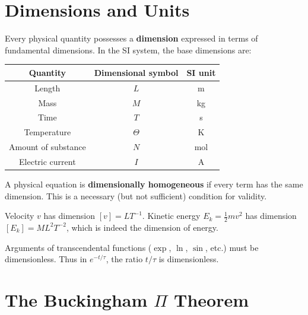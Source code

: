 \section{Dimensions and Units}

\begin{definition}
Every physical quantity possesses a \textbf{dimension} expressed in
terms of fundamental dimensions.  In the SI system, the base
dimensions are:
\begin{center}
\begin{tabular}{ccc}
\toprule
Quantity & Dimensional symbol & SI unit \\
\midrule
Length & $L$ & m \\
Mass & $M$ & kg \\
Time & $T$ & s \\
Temperature & $\Theta$ & K \\
Amount of substance & $N$ & mol \\
Electric current & $I$ & A \\
\bottomrule
\end{tabular}
\end{center}
\end{definition}

\begin{definition}
A physical equation is \textbf{dimensionally homogeneous} if every
term has the same dimension.  This is a necessary (but not sufficient)
condition for validity.
\end{definition}

\begin{example}
Velocity $v$ has dimension $[v]=LT^{-1}$.  Kinetic energy
$E_k = \tfrac{1}{2}mv^2$ has dimension $[E_k]=ML^2T^{-2}$, which is
indeed the dimension of energy.
\end{example}

\begin{remark}
Arguments of transcendental functions ($\exp$, $\ln$, $\sin$, etc.)
must be dimensionless.  Thus in $e^{-t/\tau}$, the ratio $t/\tau$ is
dimensionless.
\end{remark}

\section{The Buckingham $\Pi$ Theorem}
\label{sec:buckingham}

